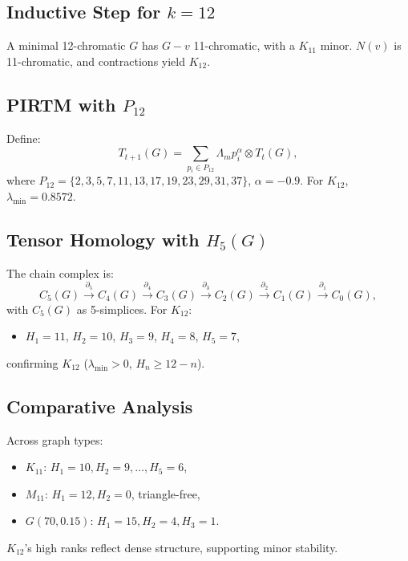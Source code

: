\documentclass[11pt]{article}
\theoremstyle{plain}
\begin{document}
\subsection{Inductive Step for \( k = 12 \)}
A minimal 12-chromatic \( G \) has \( G - v \) 11-chromatic, with a \( K_{11} \) minor. \( N(v) \) is 11-chromatic, and contractions yield \( K_{12} \).

\subsection{PIRTM with \( P_{12} \)}
Define:
\begin{equation}
T_{t+1}(G) = \sum_{p_i \in P_{12}} \Lambda_m p_i^\alpha \otimes T_t(G),
\end{equation}
where \( P_{12} = \{2, 3, 5, 7, 11, 13, 17, 19, 23, 29, 31, 37\} \), \( \alpha = -0.9 \). For \( K_{12} \), \( \lambda_{\text{min}} = 0.8572 \).

\subsection{Tensor Homology with \( H_5(G) \)}
The chain complex is:
\begin{equation}
C_5(G) \xrightarrow{\partial_5} C_4(G) \xrightarrow{\partial_4} C_3(G) \xrightarrow{\partial_3} C_2(G) \xrightarrow{\partial_2} C_1(G) \xrightarrow{\partial_1} C_0(G),
\end{equation}
with \( C_5(G) \) as 5-simplices. For \( K_{12} \):
\begin{itemize}
    \item \( H_1 = 11 \), \( H_2 = 10 \), \( H_3 = 9 \), \( H_4 = 8 \), \( H_5 = 7 \),
\end{itemize}
confirming \( K_{12} \) (\( \lambda_{\text{min}} > 0 \), \( H_n \geq 12 - n \)).

\subsection{Comparative Analysis}
Across graph types:
\begin{itemize}
    \item \( K_{11} \): \( H_1 = 10, H_2 = 9, \ldots, H_5 = 6 \),
    \item \( M_{11} \): \( H_1 = 12, H_2 = 0 \), triangle-free,
    \item \( G(70, 0.15) \): \( H_1 = 15, H_2 = 4, H_3 = 1 \).
\end{itemize}
\( K_{12} \)’s high ranks reflect dense structure, supporting minor stability.
\end{document}
